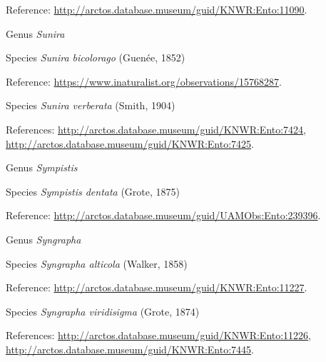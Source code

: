 \documentclass[9pt, article]{memoir}
\begin{document}
\begin{multicols}{2}
\vspace{6pt}Reference: 
\url{http://arctos.database.museum/guid/KNWR:Ento:11090}.

\vspace{6pt}\noindent\hspace{30pt}Genus \textit{Sunira}


\vspace{6pt}\noindent\hspace{36pt}Species \textit{Sunira bicolorago} (Guenée, 1852)


\vspace{6pt}Reference: 
\url{https://www.inaturalist.org/observations/15768287}.

\vspace{6pt}\noindent\hspace{36pt}Species \textit{Sunira verberata} (Smith, 1904)


\vspace{6pt}References: 
\url{http://arctos.database.museum/guid/KNWR:Ento:7424}, 
\url{http://arctos.database.museum/guid/KNWR:Ento:7425}.

\vspace{6pt}\noindent\hspace{30pt}Genus \textit{Sympistis}


\vspace{6pt}\noindent\hspace{36pt}Species \textit{Sympistis dentata} (Grote, 1875)


\vspace{6pt}Reference: 
\url{http://arctos.database.museum/guid/UAMObs:Ento:239396}.

\vspace{6pt}\noindent\hspace{30pt}Genus \textit{Syngrapha}


\vspace{6pt}\noindent\hspace{36pt}Species \textit{Syngrapha alticola} (Walker, 1858)


\vspace{6pt}Reference: 
\url{http://arctos.database.museum/guid/KNWR:Ento:11227}.

\vspace{6pt}\noindent\hspace{36pt}Species \textit{Syngrapha viridisigma} (Grote, 1874)


\vspace{6pt}References: 
\url{http://arctos.database.museum/guid/KNWR:Ento:11226}, 
\url{http://arctos.database.museum/guid/KNWR:Ento:7445}.


\end{multicols}
\end{document}
